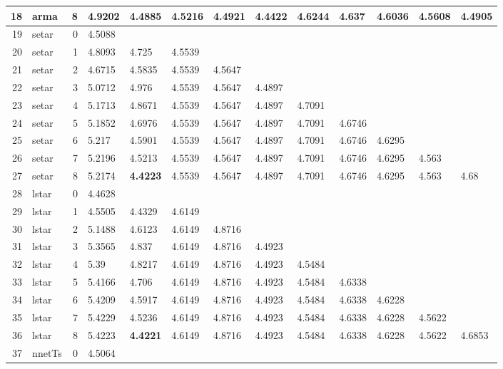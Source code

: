 \documentclass[10pt,a4paper]{article}
\begin{document}
\begin{table}[ht]
\begin{tabular}{rlrllllllllll}
  18 & arma &     8 & 4.9202 & 4.4885 & 4.5216 & 4.4921 & \textbf{4.4422} & 4.6244 & 4.637 & 4.6036 & 4.5608 & 4.4905 \\ 
   \hline
19 & setar &     0 & 4.5088 &  &  &  &  &  &  &  &  &  \\ 
  20 & setar &     1 & 4.8093 & 4.725 & 4.5539 &  &  &  &  &  &  &  \\ 
  21 & setar &     2 & 4.6715 & 4.5835 & 4.5539 & 4.5647 &  &  &  &  &  &  \\ 
  22 & setar &     3 & 5.0712 & 4.976 & 4.5539 & 4.5647 & 4.4897 &  &  &  &  &  \\ 
  23 & setar &     4 & 5.1713 & 4.8671 & 4.5539 & 4.5647 & 4.4897 & 4.7091 &  &  &  &  \\ 
  24 & setar &     5 & 5.1852 & 4.6976 & 4.5539 & 4.5647 & 4.4897 & 4.7091 & 4.6746 &  &  &  \\ 
  25 & setar &     6 & 5.217 & 4.5901 & 4.5539 & 4.5647 & 4.4897 & 4.7091 & 4.6746 & 4.6295 &  &  \\ 
  26 & setar &     7 & 5.2196 & 4.5213 & 4.5539 & 4.5647 & 4.4897 & 4.7091 & 4.6746 & 4.6295 & 4.563 &  \\ 
  27 & setar &     8 & 5.2174 & \textbf{4.4223} & 4.5539 & 4.5647 & 4.4897 & 4.7091 & 4.6746 & 4.6295 & 4.563 & 4.68 \\ 
   \hline
28 & lstar &     0 & 4.4628 &  &  &  &  &  &  &  &  &  \\ 
  29 & lstar &     1 & 4.5505 & 4.4329 & 4.6149 &  &  &  &  &  &  &  \\ 
  30 & lstar &     2 & 5.1488 & 4.6123 & 4.6149 & 4.8716 &  &  &  &  &  &  \\ 
  31 & lstar &     3 & 5.3565 & 4.837 & 4.6149 & 4.8716 & 4.4923 &  &  &  &  &  \\ 
  32 & lstar &     4 & 5.39 & 4.8217 & 4.6149 & 4.8716 & 4.4923 & 4.5484 &  &  &  &  \\ 
  33 & lstar &     5 & 5.4166 & 4.706 & 4.6149 & 4.8716 & 4.4923 & 4.5484 & 4.6338 &  &  &  \\ 
  34 & lstar &     6 & 5.4209 & 4.5917 & 4.6149 & 4.8716 & 4.4923 & 4.5484 & 4.6338 & 4.6228 &  &  \\ 
  35 & lstar &     7 & 5.4229 & 4.5236 & 4.6149 & 4.8716 & 4.4923 & 4.5484 & 4.6338 & 4.6228 & 4.5622 &  \\ 
  36 & lstar &     8 & 5.4223 & \textbf{4.4221} & 4.6149 & 4.8716 & 4.4923 & 4.5484 & 4.6338 & 4.6228 & 4.5622 & 4.6853 \\ 
   \hline
37 & nnetTs &     0 & 4.5064 &  &  &  &  &  &  &  &  &  \\ 

\end{tabular}
\end{table}
\end{document}
